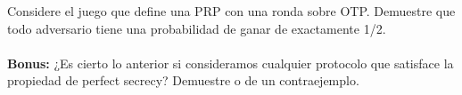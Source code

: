 
Considere el juego que define una PRP con una ronda sobre OTP. Demuestre que todo adversario tiene una probabilidad de ganar de exactamente 1/2.
\\
\\
\textbf{Bonus:} ¿Es cierto lo anterior si consideramos cualquier protocolo que satisface la propiedad de perfect secrecy? Demuestre o de un contraejemplo.
